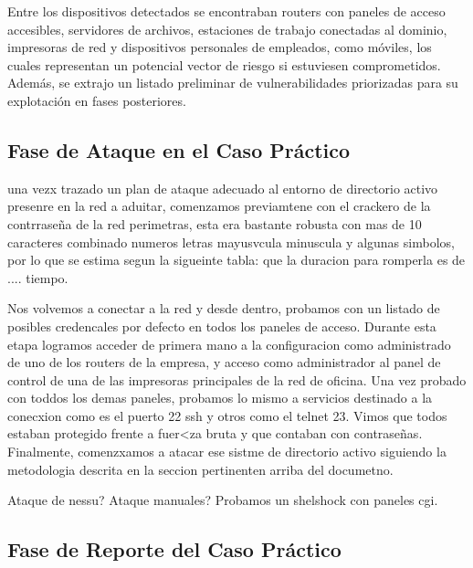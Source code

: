 \documentclass[a4paper, 11pt]{article}
\begin{document}
Entre los dispositivos detectados se encontraban routers con paneles de acceso accesibles, servidores de archivos, estaciones de trabajo conectadas al dominio, impresoras de red y dispositivos personales de empleados, como móviles, los cuales representan un potencial vector de riesgo si estuviesen comprometidos. Además, se extrajo un listado preliminar de vulnerabilidades priorizadas para su explotación en fases posteriores.




\label{sec:fingerprint}
\label{sec:analisis_vulnerabilidades}
\label{sec:osint}
\label{anexo:script_evasion}
\label{codigo:wireshark}



\subsection{Fase de Ataque en el Caso Práctico}


una vezx trazado un plan de ataque adecuado al entorno de directorio activo presenre en la red a aduitar, comenzamos previamtene con el crackero de la contrraseña de la red perimetras, esta era bastante robusta con mas de 10 caracteres combinado numeros letras mayusvcula minuscula y algunas simbolos, por lo que se estima segun la sigueinte tabla: que la duracion para romperla es de .... tiempo.

Nos volvemos a conectar a la red y desde dentro, probamos con un listado de posibles credencales por defecto en todos los paneles de acceso. Durante esta etapa logramos acceder de primera mano a la configuracion como administrado de uno de los routers de la empresa, y acceso como administrador al panel de control de una de las impresoras principales de la red de oficina. Una vez probado con toddos los demas paneles, probamos lo mismo a servicios destinado a la conecxion como es el puerto 22 ssh y otros como el telnet 23. Vimos que todos estaban protegido frente a fuer<za bruta y que contaban con contraseñas. Finalmente, comenzxamos a atacar ese sistme de directorio activo siguiendo la metodologia descrita en la seccion pertinenten arriba del documetno.

Ataque de nessu?
Ataque manuales?
Probamos un shelshock con paneles cgi.



\subsection{Fase de Reporte del Caso Práctico}
\end{document}
